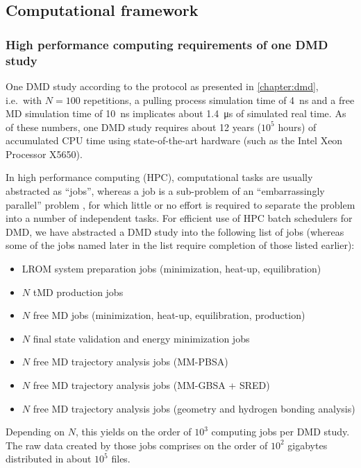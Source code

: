 \subsection{Computational framework}


\subsubsection{High performance computing requirements of one DMD study}

One DMD study according to the protocol as presented in \cref{chapter:dmd},
i.e.\ with $N = 100$ repetitions, a pulling process simulation time of
\SI{4}{\nano\second} and a free MD simulation time of \SI{10}{\nano\second}
implicates about \SI{1.4}{\micro\second} of simulated real time. As of these
numbers, one DMD study requires about 12 years ($10^5$ hours) of accumulated CPU
time using state-of-the-art hardware (such as the Intel Xeon Processor X5650).

In high performance computing (HPC), computational tasks are usually abstracted as
\enquote{jobs}, whereas a job is a sub-problem of an \enquote{embarrassingly
parallel} problem \cite{heath1986hypercube}, for which little or no effort is
required to separate the problem into a number of independent tasks. For
efficient use of HPC batch schedulers for DMD, we have abstracted a DMD study
into the following list of jobs (whereas some of the jobs named later in the
list require completion of those listed earlier):

\begin{itemize}
\item LROM system preparation jobs (minimization, heat-up, equilibration)
\item $N$ tMD production jobs
\item $N$ free MD jobs (minimization, heat-up, equilibration, production)
\item $N$ final state validation and energy minimization jobs
\item $N$ free MD trajectory analysis jobs (MM-PBSA)
\item $N$ free MD trajectory analysis jobs (MM-GBSA + SRED)
\item $N$ free MD trajectory analysis jobs (geometry and hydrogen bonding
analysis)
\end{itemize}

Depending on $N$, this yields on the order of $10^3$ computing jobs per DMD
study. The raw data created by those jobs comprises on the order of $10^2$
gigabytes distributed in about $10^5$ files.



